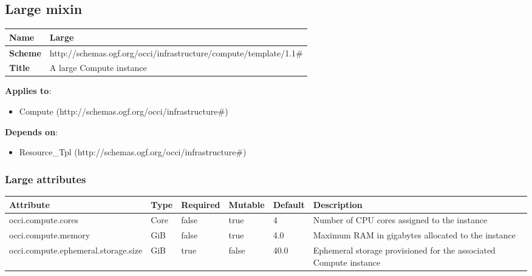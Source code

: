 \documentclass{article}
\begin{document}
\subsection{Large mixin}
\begin{center}
\begin{tabular}{|l|l|}
  \hline
  \textbf{Name} & Large \\
  \hline  
  \textbf{Scheme} & http://schemas.ogf.org/occi/infrastructure/compute/template/1.1\# \\
  \hline
  \textbf{Title} & A large Compute instance \\
  \hline
\end{tabular}
\end{center}
\textbf{Applies to}:
\begin{itemize}
	\item Compute (http://schemas.ogf.org/occi/infrastructure\#)
\end{itemize}
\textbf{Depends on}:
\begin{itemize}
	\item Resource\_Tpl (http://schemas.ogf.org/occi/infrastructure\#)
\end{itemize}

\subsubsection{Large attributes}
\begin{tabularx}{\textwidth}{|l|l|p{1.4cm}|p{1.3cm}|l|X|}
  \hline
  \textbf{Attribute} & \textbf{Type} & \textbf{Required} & \textbf{Mutable} & \textbf{Default} & \textbf{Description} \\
  \hline  
  occi.compute.cores & Core & false & true & 4 & Number of CPU cores assigned to the instance \\
  \hline
  occi.compute.memory & GiB & false & true & 4.0 & Maximum RAM in gigabytes allocated to the instance \\
  \hline
  occi.compute.ephemeral.storage.size & GiB & true & false & 40.0 & Ephemeral storage provisioned for the associated Compute instance \\
  \hline
\end{tabularx}
\end{document}
